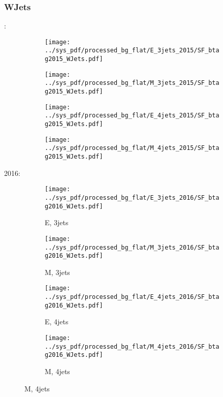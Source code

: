 \documentclass{beamer}
\begin{document}
\begin{frame}
\frametitle{WJets}
\fontsize{5}{1}:
\begin{figure}
\centering
\begin{subfigure}[b]{0.24\textwidth}
\texttt{[image: ../sys\_pdf/processed\_bg\_flat/E\_3jets\_2015/SF\_btag2015\_WJets.pdf]}
\end{subfigure}
\begin{subfigure}[b]{0.24\textwidth}
\texttt{[image: ../sys\_pdf/processed\_bg\_flat/M\_3jets\_2015/SF\_btag2015\_WJets.pdf]}
\end{subfigure}
\begin{subfigure}[b]{0.24\textwidth}
\texttt{[image: ../sys\_pdf/processed\_bg\_flat/E\_4jets\_2015/SF\_btag2015\_WJets.pdf]}
\end{subfigure}
\begin{subfigure}[b]{0.24\textwidth}
\texttt{[image: ../sys\_pdf/processed\_bg\_flat/M\_4jets\_2015/SF\_btag2015\_WJets.pdf]}
\end{subfigure}
\end{figure}
2016:
\begin{figure}
\centering
\begin{subfigure}[b]{0.24\textwidth}
\texttt{[image: ../sys\_pdf/processed\_bg\_flat/E\_3jets\_2016/SF\_btag2016\_WJets.pdf]}
\captionsetup{font=tiny}
\caption{E, 3jets}
\end{subfigure}
\begin{subfigure}[b]{0.24\textwidth}
\texttt{[image: ../sys\_pdf/processed\_bg\_flat/M\_3jets\_2016/SF\_btag2016\_WJets.pdf]}
\captionsetup{font=tiny}
\caption{M, 3jets}
\end{subfigure}
\begin{subfigure}[b]{0.24\textwidth}
\texttt{[image: ../sys\_pdf/processed\_bg\_flat/E\_4jets\_2016/SF\_btag2016\_WJets.pdf]}
\captionsetup{font=tiny}
\caption{E, 4jets}
\end{subfigure}
\begin{subfigure}[b]{0.24\textwidth}
\texttt{[image: ../sys\_pdf/processed\_bg\_flat/M\_4jets\_2016/SF\_btag2016\_WJets.pdf]}
\captionsetup{font=tiny}
\caption{M, 4jets}
\end{subfigure}
\end{figure}
\end{frame}
\end{document}
